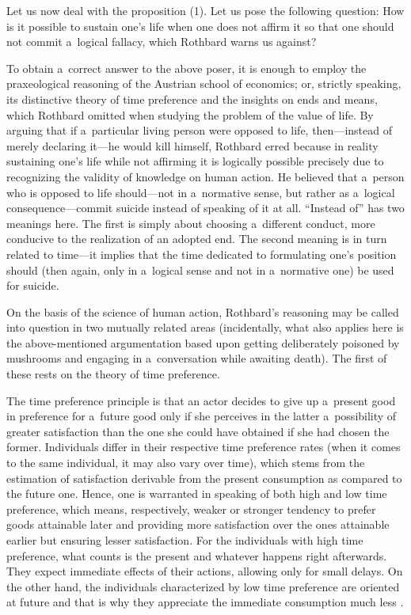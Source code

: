 Let us now deal with the proposition (1). Let us pose the following question: How is it possible to sustain one's life when one does not affirm it so that one should not commit a~logical fallacy, which Rothbard warns us against?



To obtain a~correct answer to the above poser, it is enough to employ the praxeological reasoning of the Austrian school of economics; or, strictly speaking, its distinctive theory of time preference and the insights on ends and means, which Rothbard omitted when studying the problem of the value of life. By arguing that if a~particular living person were opposed to life, then---instead of merely declaring it---he would kill himself, Rothbard erred because in reality sustaining one's life while not affirming it is logically possible precisely due to recognizing the validity of knowledge on human action. He believed that a~person who is opposed to life should---not in a~normative sense, but rather as a~logical consequence---commit suicide instead of speaking of it at all. ``Instead of'' has two meanings here. The first is simply about choosing a~different conduct, more conducive to the realization of an adopted end. The second meaning is in turn related to time---it implies that the time dedicated to formulating one's position should (then again, only in a~logical sense and not in a~normative one) be used for suicide.



On the basis of the science of human action, Rothbard's reasoning may be called into question in two mutually related areas (incidentally, what also applies here is the above-mentioned argumentation based upon getting deliberately poisoned by mushrooms and engaging in a~conversation while awaiting death). The first of these rests on the theory of time preference.



The time preference principle is that an actor decides to give up a~present good in preference for a~future good only if she perceives in the latter a~possibility of greater satisfaction than the one she could have obtained if she had chosen the former. Individuals differ in their respective time preference rates (when it comes to the same individual, it may also vary over time), which stems from the estimation of satisfaction derivable from the present consumption as compared to the future one. Hence, one is warranted in speaking of both high and low time preference, which means, respectively, weaker or stronger tendency to prefer goods attainable later and providing more satisfaction over the ones attainable earlier but ensuring lesser satisfaction. For the individuals with high time preference, what counts is the present and whatever happens right afterwards. They expect immediate effects of their actions, allowing only for small delays. On the other hand, the individuals characterized by low time preference are oriented at future and that is why they appreciate the immediate consumption much less 
\parencites[see][pp.1–6]{}[][pp.478]{}.%




